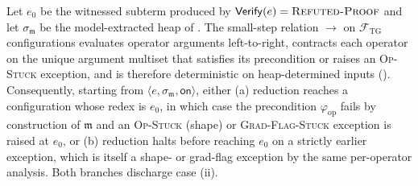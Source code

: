 \begin{lemma}
\label{lem:progress-to-witness}
Let $e_0$ be the witnessed subterm produced by
$\mathsf{Verify}(e)=\textsc{Refuted-Proof}$ and let
$\sigma_{\mathfrak{m}}$ be the model-extracted heap of
. The small-step relation $\to$ on
$\mathcal{F}_{\mathrm{TG}}$ configurations evaluates operator
arguments left-to-right, contracts each operator on the unique
argument multiset that satisfies its precondition or raises an
\textsc{Op-Stuck} exception, and is therefore deterministic on
heap-determined inputs (). Consequently,
starting from $\langle e,\sigma_{\mathfrak{m}},\mathsf{on}\rangle$,
either (a) reduction reaches a configuration whose redex is
$e_0$, in which case the precondition $\varphi_{\mathrm{op}}$
fails by construction of $\mathfrak{m}$ and an
\textsc{Op-Stuck} (shape) or
\textsc{Grad-Flag-Stuck} exception is raised at $e_0$, or
(b) reduction halts before reaching $e_0$ on a strictly earlier
exception, which is itself a shape- or grad-flag exception by
the same per-operator analysis. Both branches discharge
case (ii).
\end{lemma}

